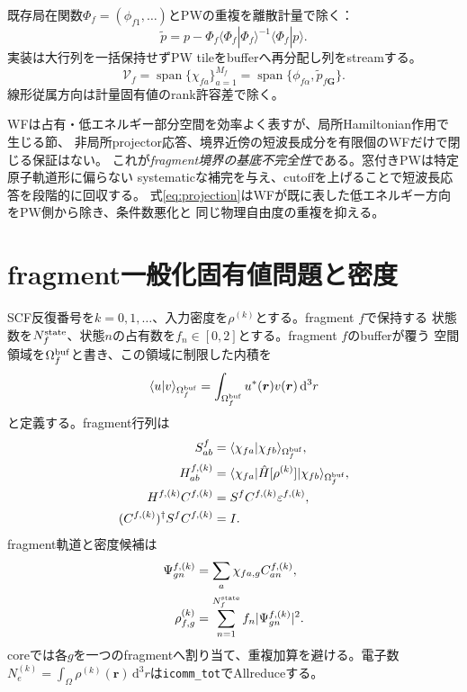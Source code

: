 \documentclass[11pt,a4paper]{article}
\newcommand{\dd}{\mathrm d}
\newcommand{\code}[1]{\texttt{#1}}
\begin{document}
既存局在関数$\Phi_f=(\phi_{f1},\ldots)$とPWの重複を離散計量で除く：
\begin{equation}
 \widetilde p=p-\Phi_f
 \langle\Phi_f|\Phi_f\rangle^{-1}\langle\Phi_f|p\rangle.
 \label{eq:projection}
\end{equation}
実装は大行列を一括保持せずPW tileをbufferへ再分配し列をstreamする。
\begin{equation}
 \mathcal V_f=\operatorname{span}\{\chi_{fa}\}_{a=1}^{M_f}
 =\operatorname{span}\{\phi_{f\alpha},\widetilde p_{f\boldsymbol G}\}.
\end{equation}
線形従属方向は計量固有値のrank許容差で除く。

WFは占有・低エネルギー部分空間を効率よく表すが、局所Hamiltonian作用で生じる節、
非局所projector応答、境界近傍の短波長成分を有限個のWFだけで閉じる保証はない。
これが\emph{fragment境界の基底不完全性}である。窓付きPWは特定原子軌道形に偏らない
systematicな補完を与え、cutoffを上げることで短波長応答を段階的に回収する。
式\eqref{eq:projection}はWFが既に表した低エネルギー方向をPW側から除き、条件数悪化と
同じ物理自由度の重複を抑える。

\section{fragment一般化固有値問題と密度}
SCF反復番号を$k=0,1,\ldots$、入力密度を$\rho^{(k)}$とする。fragment $f$で保持する
状態数を$N_f^{\rm state}$、状態$n$の占有数を$f_n\in[0,2]$とする。fragment $f$のbufferが覆う
空間領域を$\Omega_f^{\rm buf}$と書き、この領域に制限した内積を
\begin{equation}
 \langle u|v\rangle_{\Omega_f^{\rm buf}}
 =\int_{\Omega_f^{\rm buf}}u^*(\boldsymbol r)v(\boldsymbol r)\,\dd^3r
 \label{eq:buffer-inner-product}
\end{equation}
と定義する。fragment行列は
\begin{align}
 S^f_{ab}&=\langle\chi_{fa}|\chi_{fb}\rangle_{\Omega_f^{\rm buf}},\\
 H^{f,(k)}_{ab}&=\langle\chi_{fa}|\hat H[\rho^{(k)}]|\chi_{fb}\rangle_{\Omega_f^{\rm buf}},\\
 H^{f,(k)}C^{f,(k)}&=S^fC^{f,(k)}\varepsilon^{f,(k)},\\
 (C^{f,(k)})^\dagger S^fC^{f,(k)}&=I.
\end{align}
fragment軌道と密度候補は
\begin{align}
 \Psi^{f,(k)}_{gn}&=\sum_a\chi_{fa,g}C^{f,(k)}_{an},\\
 \rho^{(k)}_{f,g}&=\sum_{n=1}^{N_f^{\rm state}}f_n|\Psi^{f,(k)}_{gn}|^2.
 \label{eq:density}
\end{align}
coreでは各$g$を一つのfragmentへ割り当て、重複加算を避ける。電子数
$N_e^{(k)}=\int_\Omega\rho^{(k)}(\boldsymbol r)\,\dd^3r$は\code{icomm\_tot}でAllreduceする。
\end{document}

